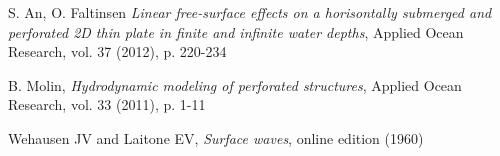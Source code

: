 \begin{thebibliography}{99} %

  S. An, O. Faltinsen
  \emph{Linear free-surface effects on a horisontally submerged and perforated 2D thin plate in finite and infinite water depths},
  Applied Ocean Research,
  vol. 37 (2012),
  p. 220-234

  B. Molin,
  \emph{Hydrodynamic modeling of perforated structures},
  Applied Ocean Research,
  vol. 33 (2011),
  p. 1-11

  Wehausen JV and Laitone EV,
  \emph{Surface waves},
  online edition (1960)

\end{thebibliography}